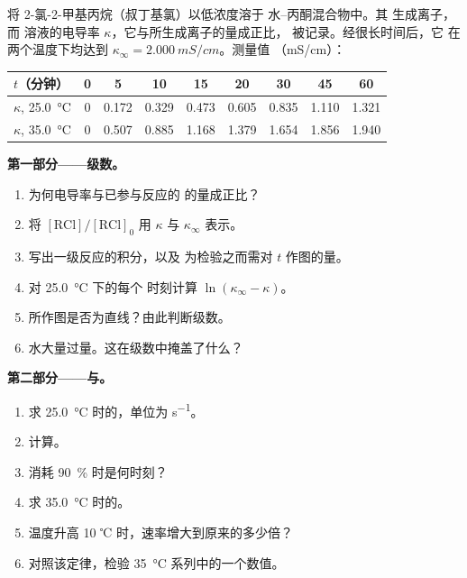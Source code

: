 \begin{problem}
\label{pb:b1:nucleophilic-substitution:1}
将 2-氯-2-甲基丙烷（叔丁基氯）以低浓度溶于
水–丙酮混合物中。其
 生成离子，而
溶液的电导率 $\kappa$，它与所生成离子的量成正比，
被记录。经很长时间后，它
在两个温度下均达到 $\kappa_\infty = \qty{2.000}{mS/cm}$。测量值
（\unit{mS/cm}）：

\begin{center}
\begin{tabular}{lcccccccc}
\hline
$t$（分钟） & 0 & 5 & 10 & 15 & 20 & 30 & 45 & 60 \\
\hline
$\kappa$, \qty{25.0}{\celsius} & 0 & 0.172 & 0.329 & 0.473 & 0.605 & 0.835 & 1.110 & 1.321 \\
$\kappa$, \qty{35.0}{\celsius} & 0 & 0.507 & 0.885 & 1.168 & 1.379 & 1.654 & 1.856 & 1.940 \\
\hline
\end{tabular}
\end{center}

\medskip
\noindent\textbf{第一部分——级数。}
\begin{enumerate}
  \item 为何电导率与已参与反应的
        的量成正比？
  \item 将 $[\mathrm{RCl}]/[\mathrm{RCl}]_0$ 用
        $\kappa$ 与 $\kappa_\infty$ 表示。
  \item 写出一级反应的积分，以及
        为检验之而需对 $t$ 作图的量。
  \item 对 \qty{25.0}{\celsius} 下的每个
        时刻计算 $\ln(\kappa_\infty - \kappa)$。
  \item 所作图是否为直线？由此判断级数。
  \item 水大量过量。这在级数中掩盖了什么？
\end{enumerate}

\medskip
\noindent\textbf{第二部分——与。}
\begin{enumerate}[resume]
  \item 求 \qty{25.0}{\celsius} 时的，单位为 \unit{s^{-1}}。
  \item 计算。
  \item {}消耗 \qty{90}{\percent} 时是何时刻？
  \item 求 \qty{35.0}{\celsius} 时的。
  \item 温度升高 10 ℃ 时，速率增大到原来的多少倍？
  \item 对照该定律，检验 \qty{35}{\celsius} 系列中的一个数值。
\end{enumerate}


\end{problem}
